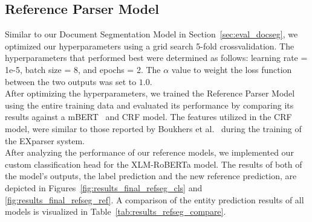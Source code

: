 \subsection{Reference Parser Model}\label{sec:eval_refseg}

Similar to our Document Segmentation Model in Section~\ref{sec:eval_docseg}, we optimized our hyperparameters using a grid search 5-fold crossvalidation. The hyperparameters that performed best were determined as follows: learning rate = 1e-5, batch size = 8, and epochs = 2. The $\alpha$ value to weight the loss function between the two outputs was set to $1.0$.\\
After optimizing the hyperparameters, we trained the Reference Parser Model using the entire training data and evaluated its performance by comparing its results against a mBERT~\cite{hug_cased_bert} and CRF model. The features utilized in the CRF model, were similar to those reported by Boukhers et al.~\cite{excite_methods} during the training of the EXparser system.\\
After analyzing the performance of our reference models, we implemented our custom classification head for the XLM-RoBERTa model. The results of both of the model's outputs, the label prediction and the new reference prediction, are depicted in Figures~\ref{fig:results_final_refseg_cls} and \ref{fig:results_final_refseg_ref}. A comparison of the entity prediction results of all models is visualized in Table~\ref{tab:results_refseg_compare}.


